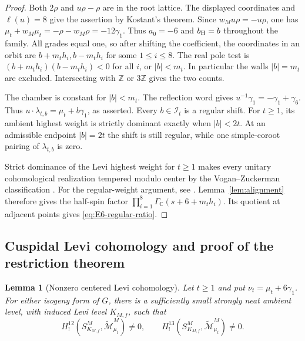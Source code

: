 \documentclass[12pt]{amsart}
\numberwithin{equation}{section}
\theoremstyle{plain}
\newtheorem{lemma}[theorem]{Lemma}
\theoremstyle{definition}
\theoremstyle{remark}
\newcommand{\C}{\mathbb C}
\newcommand{\Z}{\mathbb{Z}}
\newcommand{\tcM}{\widetilde{\mathcal M}}
\begin{document}
\begin{proof}
Both $2\rho$ and $u\rho-\rho$ are in the root lattice. The displayed coordinates and $\ell(u)=8$ give the assertion by Kostant's theorem. Since $w_M u\rho=-u\rho$, one has $\mu_t+w_M\mu_t=-\rho-w_M\rho=-12\gamma_1$. Thus $a_0=-6$ and $b_{\rm H}=b$ throughout the family. All grades equal one, so after shifting the coefficient, the coordinates in an orbit are $b+m_t h_i,b-m_t h_i$ for some $1\le i\le 8$. The real pole test is $(b+m_t h_i)(b-m_t h_i)<0$ for all $i$, or $|b|<m_t$. In particular the walls $|b|=m_t$ are excluded. Intersecting with $\Z$ or $3\Z$ gives the two counts.

The chamber is constant for $|b|<m_t$. The reflection word gives $u^{-1}\gamma_1=-\gamma_1+\gamma_6$. Thus $u\cdot\lambda_{t,b}=\mu_t+b\gamma_1$, as asserted. Every $b\in\mathcal I_t$ is a regular shift. For $t\ge1$, its ambient highest weight is strictly dominant exactly when $|b|<2t$. At an admissible endpoint $|b|=2t$ the shift is still regular, while one simple-coroot pairing of $\lambda_{t,b}$ is zero.

Strict dominance of the Levi highest weight for $t\ge1$ makes every unitary cohomological realization tempered modulo center by the Vogan--Zuckerman classification \cite{VoganZuckerman1984}. For the regular-weight argument, see \cite[\S7.3.1]{Grobner2013}. Lemma~\ref{lem:alignment} therefore gives the half-spin factor $\prod_{i=1}^8\Gamma_\C(s+6+m_t h_i)$. Its quotient at adjacent points gives \eqref{eq:E6-regular-ratio}.
\end{proof}

\subsection{Cuspidal Levi cohomology and proof of the restriction theorem}
\begin{lemma}[Nonzero centered Levi cohomology] \label{lem:E6-centered-existence}
Let $t\geq1$ and put $\nu_t=\mu_t+6\gamma_1$. For either isogeny form of $G$, there is a sufficiently small strongly neat ambient level, with induced Levi level $K_{M,f}$, such that
\[
 H_!^{12}(S^M_{K_{M,f}},\tcM_{\mu_t}^M)\ne0,
 \qquad
 H_!^{13}(S^M_{K_{M,f}},\tcM_{\mu_t}^M)\ne0.
\]
\end{lemma}
\end{document}
